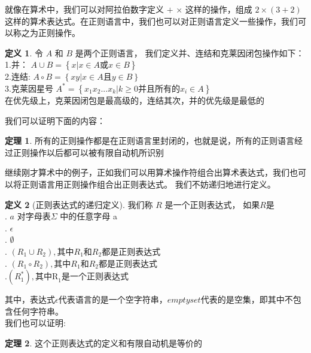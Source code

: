 \documentclass[openany,oneside]{book}
\theoremstyle{definition}
\newtheorem{definition}{\hspace{2em}定义}[chapter]
\newtheorem{theorem}{\hspace{2em}定理}[chapter]
\theoremstyle{definition}
\begin{document}
	就像在算术中，我们可以对阿拉伯数字定义 \(+\) \(\times\) 这样的操作，组成 \( 2 \times \left( 3 +2\right) \)这样的算术表达式。在正则语言中，我们也可以对正则语言定义一些操作，我们可以称之为正则操作。
	\begin{definition}
		令 \(A\) 和 \(B\) 是两个正则语言， 我们定义并、连结和克莱因闭包操作如下：\\
		\indent \indent 1.并： \(A \cup B = \left\lbrace x|x \in A \mbox{或} x \in B \right\rbrace \)\\
		\indent \indent 2.连结: \(A \circ B = \left\lbrace xy| x \in A \mbox{且} y\in B \right\rbrace\)\\
		\indent \indent 3.克莱因星号 \(A^* = \left\lbrace x_1 x_2 ...x_k | k \ge 0 \mbox{并且所有的} x_i \in  A \right\rbrace\)\\
		\indent \indent 在优先级上，克莱因闭包是最高级的，连结其次，并的优先级是最低的
	\end{definition}
	我们可以证明下面的内容：
	\begin{theorem}
		所有的正则操作都是在正则语言里封闭的，也就是说，所有的正则语言经过正则操作以后都可以被有限自动机所识别
	\end{theorem}

	
	\indent 继续刚才算术中的例子，正如我们可以用算术操作符组合出算术表达式，我们也可以将正则语言用正则操作组合出正则表达式。
	我们不妨递归地进行定义。
	\begin{definition}[正则表达式的递归定义]
		我们称 \(R\) 是一个正则表达式， 如果\(R\)是 \\
		\indent {}. \(a\) 对字母表\(\Sigma\) 中的任意字母 a\\
		\indent {}. \(\epsilon\)\\
		\indent {}. $\emptyset$\\
		\indent {}. \(\left(  R_1 \cup R_2 \right) ,\mbox{其中}R_1\mbox{和}R_2 \mbox{都是正则表达式}  \)\\
		\indent {}. \( \left( R_1 \circ R_2 \right),\mbox{其中}R_1\mbox{和}R_2\mbox{都是正则表达式}\)\\
		\indent {}.\(\left( R_1^* \right) , \mbox{其中R}_1\mbox{是一个正则表达式}\)\\
		\indent 
	\end{definition}
	其中，表达式\(\epsilon\)代表语言的是一个空字符串，\(emptyset\)代表的是空集，即其中不包含任何字符串。\\
	\indent 我们也可以证明:
	\begin{theorem}
		这个正则表达式的定义和有限自动机是等价的
	\end{theorem}
\end{document}
